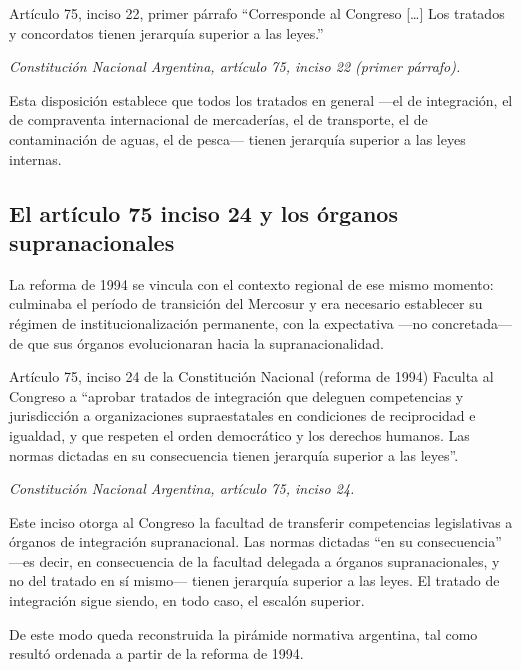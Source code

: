 \documentclass[12pt,oneside]{book}
\begin{document}
\begin{definition}{Artículo 75, inciso 22, primer párrafo}
``Corresponde al Congreso [\ldots] Los tratados y concordatos tienen jerarquía superior a las leyes.''

\textit{Constitución Nacional Argentina, artículo 75, inciso 22 (primer párrafo).}
\end{definition}

Esta disposición establece que todos los tratados en general —el de integración, el de compraventa internacional de mercaderías, el de transporte, el de contaminación de aguas, el de pesca— tienen jerarquía superior a las leyes internas.

\subsection{El artículo 75 inciso 24 y los órganos supranacionales}

La reforma de 1994 se vincula con el contexto regional de ese mismo momento: culminaba el período de transición del Mercosur y era necesario establecer su régimen de institucionalización permanente, con la expectativa —no concretada— de que sus órganos evolucionaran hacia la supranacionalidad.

\begin{definition}{Artículo 75, inciso 24 de la Constitución Nacional (reforma de 1994)}
Faculta al Congreso a ``aprobar tratados de integración que deleguen competencias y jurisdicción a organizaciones supraestatales en condiciones de reciprocidad e igualdad, y que respeten el orden democrático y los derechos humanos. Las normas dictadas en su consecuencia tienen jerarquía superior a las leyes''.

\textit{Constitución Nacional Argentina, artículo 75, inciso 24.}
\end{definition}

Este inciso otorga al Congreso la facultad de transferir competencias legislativas a órganos de integración supranacional. Las normas dictadas ``en su consecuencia'' —es decir, en consecuencia de la facultad delegada a órganos supranacionales, y no del tratado en sí mismo— tienen jerarquía superior a las leyes. El tratado de integración sigue siendo, en todo caso, el escalón superior.

De este modo queda reconstruida la pirámide normativa argentina, tal como resultó ordenada a partir de la reforma de 1994.
\end{document}
